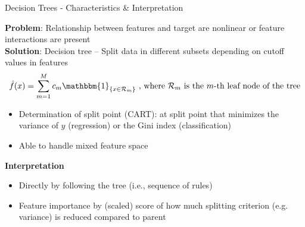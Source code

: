 \documentclass[11pt,compress,t,notes=noshow, aspectratio=169, xcolor=table]{beamer}
\begin{document}

\begin{frame}{Decision Trees - Characteristics \& Interpretation}

\textbf{Problem}: Relationship between features and target are nonlinear or feature interactions are present\\
\medskip
\pause
\textbf{Solution}: Decision tree  -- Split data in different subsets depending on cutoff values in features 
$$
\hat f(x) = \sum_{m=1}^M c_m \mathbbm{1}_{\{x \in \mathcal{R}_m\}}\text{ ,  where $\mathcal{R}_m$ is the $m$-th leaf node of the tree}
$$

\begin{itemize}
    \item Determination of split point (CART): at split point that minimizes the variance of $y$ (regression) or the Gini index (classification)
    \item Able to handle mixed feature space
\end{itemize}
\medskip
\pause
\textbf{Interpretation}
\begin{itemize}
    \item Directly by following the tree (i.e., sequence of rules)
    \item Feature importance by (scaled) score of how much splitting criterion (e.g. variance) is reduced compared to parent
\end{itemize}



\end{frame}
\end{document}
